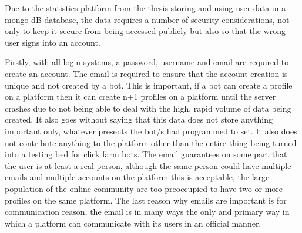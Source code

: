 \documentclass{article}
\begin{document}
Due to the statistics platform from the thesis storing and using user data in a mongo dB database, the data requires a number of security considerations, not only to keep it secure from being accessed publicly but also so that the wrong user signs into an account. 


Firstly, with all login systems, a password, username and email are required to create an account. 
The email is required to ensure that the account creation is unique and not created by a bot. This is important, if a bot can create a profile on a platform then it can create n+1 profiles on a platform until the server crashes due to not being able to deal with the high, rapid volume of data being created.  It also goes without saying that this data does not store anything important only, whatever presents the bot/s had programmed to set. It also does not contribute anything to the platform other than the entire thing being turned into a testing bed for click farm bots. The email guarantees on some part that the user is at least a real person, although the same person could have multiple emails and multiple accounts on the platform this is acceptable, the large population of the online community are too preoccupied to have two or more profiles on the same platform.  The last reason why emails are important is for communication reason, the email is in many ways the only and primary way in which a platform can communicate with its users in an official manner.
\end{document}
